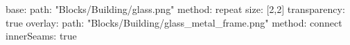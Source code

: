 base:
  path: "Blocks/Building/glass.png"
  method: repeat
  size: [2,2]
  transparency: true
overlay:
  path: "Blocks/Building/glass_metal_frame.png"
  method: connect
  innerSeams: true